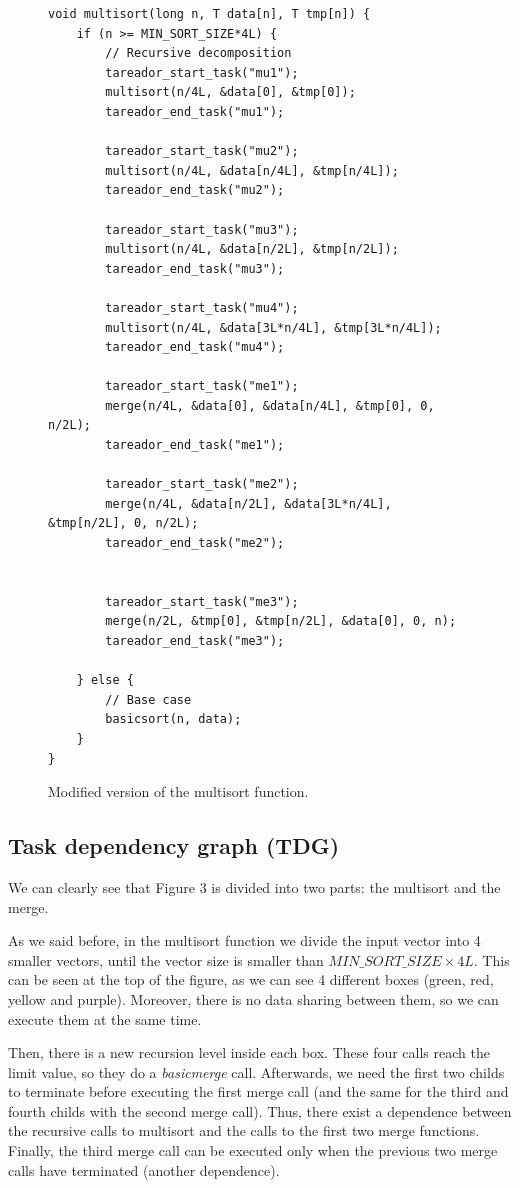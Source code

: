 \documentclass[12pt, a4paper]{article}
\begin{document}
\begin{figure}[H]
\begin{lstlisting}
void multisort(long n, T data[n], T tmp[n]) {
    if (n >= MIN_SORT_SIZE*4L) {
        // Recursive decomposition
        tareador_start_task("mu1");
        multisort(n/4L, &data[0], &tmp[0]);
        tareador_end_task("mu1");

        tareador_start_task("mu2");
        multisort(n/4L, &data[n/4L], &tmp[n/4L]);
        tareador_end_task("mu2");

        tareador_start_task("mu3");
        multisort(n/4L, &data[n/2L], &tmp[n/2L]);
        tareador_end_task("mu3");

        tareador_start_task("mu4");
        multisort(n/4L, &data[3L*n/4L], &tmp[3L*n/4L]);
        tareador_end_task("mu4");

        tareador_start_task("me1");
        merge(n/4L, &data[0], &data[n/4L], &tmp[0], 0, n/2L);
        tareador_end_task("me1");

        tareador_start_task("me2");
        merge(n/4L, &data[n/2L], &data[3L*n/4L], &tmp[n/2L], 0, n/2L);
        tareador_end_task("me2");


        tareador_start_task("me3");
        merge(n/2L, &tmp[0], &tmp[n/2L], &data[0], 0, n);
        tareador_end_task("me3");

    } else {
        // Base case
        basicsort(n, data);
    }
}
\end{lstlisting}

\label{code:multisort_tareador}
\caption{Modified version of the multisort function.}
\end{figure}

\subsection{Task dependency graph (TDG)}
\label{subsec:TDG}

We can clearly see that Figure 3 is divided into two parts: the multisort and the merge.

As we said before, in the multisort function we divide the input vector into 4 smaller vectors, until the vector size is smaller than $MIN\_SORT\_SIZE \times 4L$. This can be seen at the top of the figure, as we can see 4 different boxes (green, red, yellow and purple). Moreover, there is no data sharing between them, so we can execute them at the same time.

Then, there is a new recursion level inside each box. These four calls reach the limit value, so they do a \textit{basicmerge} call. Afterwards, we need the first two childs to terminate before executing the first merge call (and the same for the third and fourth childs with the second merge call). Thus, there exist a dependence between the recursive calls to multisort and the calls to the first two merge functions. Finally, the third merge call can be executed only when the previous two merge calls have terminated (another dependence).
\end{document}
